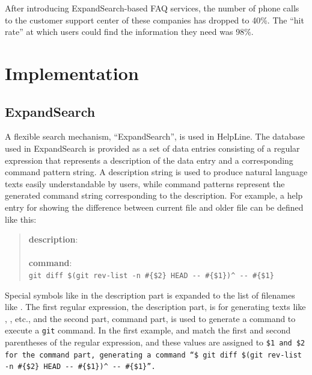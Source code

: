 \documentclass[manuscript,anonymous,review]{acmart}
\def\HL{\textsf{HelpLine}}
\def\GIT{\texttt{git}}
\def\ES{\textsf{ExpandSearch}}
\begin{document}
After introducing ExpandSearch-based FAQ services,
the number of phone calls to the customer support center of these companies has
dropped to 40\%.
%
The ``hit rate'' at which users could find the information they need was 98\%.

\section{Implementation}


\subsection{ExpandSearch}

A flexible search mechanism, ``{\ES}'', is used in {\HL}.
%
The database used in {\ES} is provided as a set of data entries
consisting of a regular expression that represents a description of the data entry
and a corresponding command pattern string.
A description string is used to produce natural language texts
easily understandable by users,
while command patterns represent the generated command string
corresponding to the description.
%
For example, a help entry for showing the difference between
current file and older file can be defined like this:

\begin{quote}
  \textbf{description}: \\
  \\
  \textbf{command}: \\
  {\smallfont\verb|git diff $(git rev-list -n #{$2} HEAD -- #{$1})^ -- #{$1}|}
\end{quote}

Special symbols like  in the description part is expanded to
the list of filenames like .
The first regular expression, the description part,
is for generating texts like
, 
, etc.,
and the second part, command part,
is used to generate a command to execute a {\GIT} command.
In the first example,  and 
match the first and second parentheses of the regular expression, and
these values are assigned to \tt{\$1} and \tt{\$2}
for the command part, generating a command
``{\smallfont\verb|$ git diff $(git rev-list -n #{$2} HEAD -- #{$1})^|}
{\smallfont\verb|-- #{$1}|}''.
\end{document}
